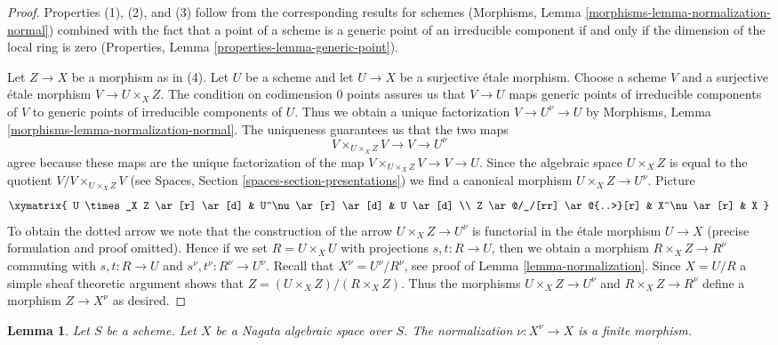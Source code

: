 \documentclass{stacks-project}
\theoremstyle{plain}
\newtheorem{lemma}[subsection]{Lemma}
\theoremstyle{definition}
\theoremstyle{remark}
\numberwithin{equation}{subsection}
\begin{document}
\begin{proof}
Properties (1), (2), and (3) follow from the corresponding results
for schemes (Morphisms, Lemma \ref{morphisms-lemma-normalization-normal})
combined with the fact that a point of a scheme is a generic
point of an irreducible component if and only if the dimension
of the local ring is zero
(Properties, Lemma \ref{properties-lemma-generic-point}).

\medskip\noindent
Let $Z \to X$ be a morphism as in (4). Let $U$ be a scheme and let
$U \to X$ be a surjective \'etale morphism. Choose a scheme $V$ and
a surjective \'etale morphism $V \to U \times_X Z$. The condition on
codimension $0$ points assures us that $V \to U$ maps generic points of
irreducible components of $V$ to generic points of irreducible
components of $U$. Thus we obtain a unique factorization
$V \to U^\nu \to U$ by
Morphisms, Lemma \ref{morphisms-lemma-normalization-normal}.
The uniqueness guarantees us that the two maps
$$
V \times_{U \times_X Z} V \to V \to U^\nu
$$
agree because these maps are the unique factorization of the map
$V \times_{U \times_X Z} V \to V \to U$.
Since the algebraic space $U \times_X Z$ is equal to the quotient
$V/V \times_{U \times_X Z} V$
(see Spaces, Section \ref{spaces-section-presentations})
we find a canonical morphism
$U \times_X Z \to U^\nu$. Picture
$$
\xymatrix{
U \times_X Z \ar[r] \ar[d] & U^\nu \ar[r] \ar[d] & U \ar[d] \\
Z \ar@/_/[rr] \ar@{..>}[r] & X^\nu \ar[r] & X
}
$$
To obtain the dotted arrow we note that the construction of the
arrow $U \times_X Z \to U^\nu$ is functorial in the \'etale morphism $U \to X$
(precise formulation and proof omitted).
Hence if we set $R = U \times_X U$ with projections $s, t : R \to U$,
then we obtain a morphism $R \times_X Z \to R^\nu$ commuting with
$s, t : R \to U$ and $s^\nu, t^\nu : R^\nu \to U^\nu$.
Recall that $X^\nu = U^\nu/R^\nu$, see proof of
Lemma \ref{lemma-normalization}. Since $X = U/R$ a
simple sheaf theoretic argument
shows that $Z = (U \times_X Z)/(R \times_X Z)$. Thus the morphisms
$U \times_X Z \to U^\nu$ and $R \times_X Z \to R^\nu$ define a
morphism $Z \to X^\nu$ as desired.
\end{proof}

\begin{lemma}
\label{lemma-nagata-normalization}
Let $S$ be a scheme. Let $X$ be a Nagata algebraic space over $S$.
The normalization $\nu : X^\nu \to X$ is a finite morphism.
\end{lemma}
\end{document}
